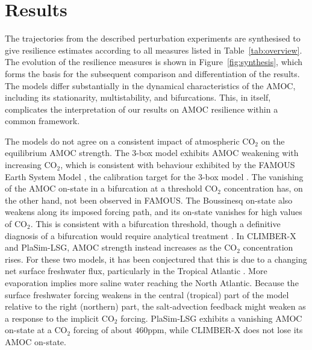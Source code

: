 \documentclass[12pt, a4paper]{article}
\newcommand{\CO}{CO\ensuremath{_2}}
\begin{document}
\section{Results}
\label{sec:results}

The trajectories from the described perturbation experiments are synthesised to give resilience estimates according to all measures listed in Table~\ref{tab:overview}. The evolution of the resilience measures is shown in Figure~\ref{fig:synthesis}, which forms the basis for the subsequent comparison and differentiation of the results. The models differ substantially in the dynamical characteristics of the AMOC, including its stationarity, multistability, and bifurcations. This, in itself, complicates the interpretation of our results on AMOC resilience within a common framework.

The models do not agree on a consistent impact of atmospheric \CO{} on the equilibrium AMOC strength. The 3-box model exhibits AMOC weakening with increasing \CO{}, which is consistent with behaviour exhibited by the FAMOUS Earth System Model \citep{Bouttes2015NonlinearityOceanHeat}, the calibration target for the 3-box model \citep{Alkhayuon2019AMOCRateTipping}. The vanishing of the AMOC on-state in a bifurcation at a threshold \CO{} concentration has, on the other hand, not been observed in FAMOUS. The Boussinesq on-state also weakens along its imposed forcing path, and its on-state vanishes for high values of \CO{}. This is consistent with a bifurcation threshold, though a definitive diagnosis of a bifurcation would require analytical treatment \citep{Noack2003FluidFlowHopfMeanField}. In CLIMBER-X and PlaSim-LSG, AMOC strength instead increases as the \CO{} concentration rises. For these two models, it has been conjectured that this is due to a changing net surface freshwater flux, particularly in the Tropical Atlantic \citep{Willeit2024GeneralizedStabilityLandscape}. More evaporation implies more saline water reaching the North Atlantic. Because the surface freshwater forcing weakens in the central (tropical) part of the model relative to the right (northern) part, the salt-advection feedback might weaken as a response to the implicit \CO{} forcing. PlaSim-LSG exhibits a vanishing AMOC on-state at a \CO{} forcing of about $460$ppm, while CLIMBER-X does not lose its AMOC on-state.
\end{document}

